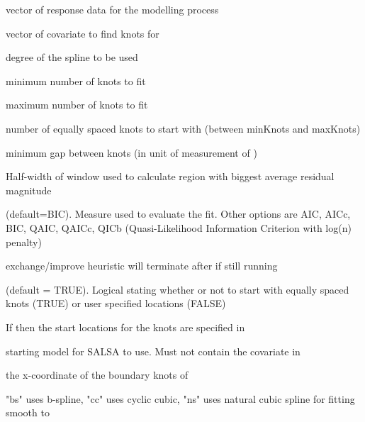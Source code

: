 \documentclass[a4paper]{book}
\begin{document}
\begin{Arguments}
\begin{ldescription}
\item[\code{response}] vector of response data for the modelling process

\item[\code{explanatory}] vector of covariate to find knots for

\item[\code{degree}] degree of the spline to be used

\item[\code{minKnots}] minimum number of knots to fit

\item[\code{maxKnots}] maximum number of knots to fit

\item[\code{startKnots}] number of equally spaced knots to start with (between minKnots and maxKnots)

\item[\code{gap}] minimum gap between knots (in unit of measurement of )

\item[\code{winHalfWidth}] Half-width of window used to calculate region with biggest average residual magnitude

\item[\code{fitnessMeasure}] (default=BIC). Measure used to evaluate the fit. Other options are AIC, AICc, BIC, QAIC, QAICc, QICb (Quasi-Likelihood Information Criterion with log(n) penalty)

\item[\code{maxIterations}] exchange/improve heuristic will terminate after  if still running

\item[\code{initialise}] (default = TRUE). Logical stating whether or not to start with equally spaced knots (TRUE) or user specified locations (FALSE)

\item[\code{initialKnots}] If  then the start locations for the knots are specified in 

\item[\code{baseModel}] starting model for SALSA to use.  Must not contain the covariate in 

\item[\code{bd}] the x-coordinate of the boundary knots of 

\item[\code{spl}] "bs" uses b-spline, "cc" uses cyclic cubic, "ns" uses natural cubic spline for fitting smooth to 
\end{ldescription}
\end{Arguments}
\end{document}
